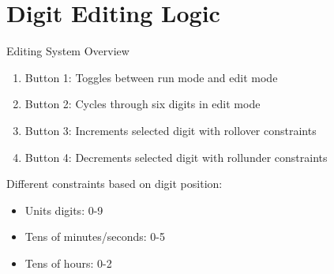 \documentclass{beamer}
\begin{document}
\section{Digit Editing Logic}
\begin{frame}{Editing System Overview}
    \begin{enumerate}
        \item Button 1: Toggles between run mode and edit mode
        \item Button 2: Cycles through six digits in edit mode
        \item Button 3: Increments selected digit with rollover constraints
        \item Button 4: Decrements selected digit with rollunder constraints
    \end{enumerate}
    
    \vspace{0.5cm}
    Different constraints based on digit position:
    \begin{itemize}
        \item Units digits: 0-9
        \item Tens of minutes/seconds: 0-5
        \item Tens of hours: 0-2
    \end{itemize}
\end{frame}
\end{document}
